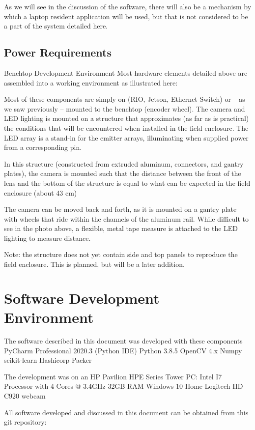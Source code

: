 \documentclass[letterpaper]{article}
\begin{document}
As we will see in the discussion of the software, there will also be a mechanism by which a laptop resident application will be used, but that is not considered to be a part of the system detailed here.

\subsection{Power Requirements}
Benchtop Development Environment
Most hardware elements detailed above are assembled into a working environment as illustrated here:


Most of these components are simply on (RIO, Jetson, Ethernet Switch) or -- as we saw previously --  mounted to the benchtop (encoder wheel).  The camera and LED lighting is mounted on a structure that approximates (as far as is practical) the conditions that will be encountered when installed in the field enclosure. The LED array is a stand-in for the emitter arrays, illuminating when supplied power from a corresponding pin.

In this structure (constructed from extruded aluminum, connectors, and gantry plates), the camera is mounted such that the distance between the front of the lens and the bottom of the structure is equal to what can be expected in the field enclosure (about 43 cm)




The camera can be moved back and forth, as it is mounted on a gantry plate with wheels that ride within the channels of the aluminum rail.  While difficult to see in the photo above, a flexible, metal tape measure is attached to the LED lighting to measure distance.

Note: the structure does not yet contain side and top panels to reproduce the field enclosure. This is planned, but will be a later addition.

\section{Software Development Environment}
The software described in this document was developed with these components
PyCharm Professional 2020.3 (Python IDE)
Python 3.8.5
OpenCV 4.x
Numpy
scikit-learn
Hashicorp Packer

The development was on an HP Pavilion HPE Series Tower PC:
Intel I7 Processor with 4 Cores @ 3.4GHz
32GB RAM
Windows 10 Home
Logitech HD C920 webcam

All software developed and discussed in this document can be obtained from this git repository:
\end{document}

